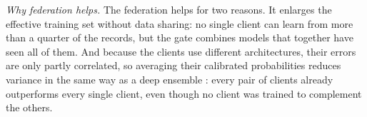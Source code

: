 \textit{Why federation helps.} The federation helps for two reasons. It enlarges the effective
training set without data sharing: no single client can learn from more than a quarter of the
records, but the gate combines models that together have seen all of them. And because the clients
use different architectures, their errors are only partly correlated, so averaging their calibrated
probabilities reduces variance in the same way as a deep ensemble \cite{lakshminarayanan2017,dietterich2000ensemble}:
every pair of clients already outperforms every single client, even though no client was trained to
complement the others.
